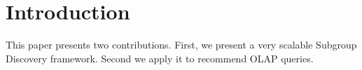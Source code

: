\section{Introduction}
\label{sec:intro}

This paper presents two contributions. First, we present a very scalable
Subgroup Discovery framework. Second we apply it to recommend OLAP queries.
